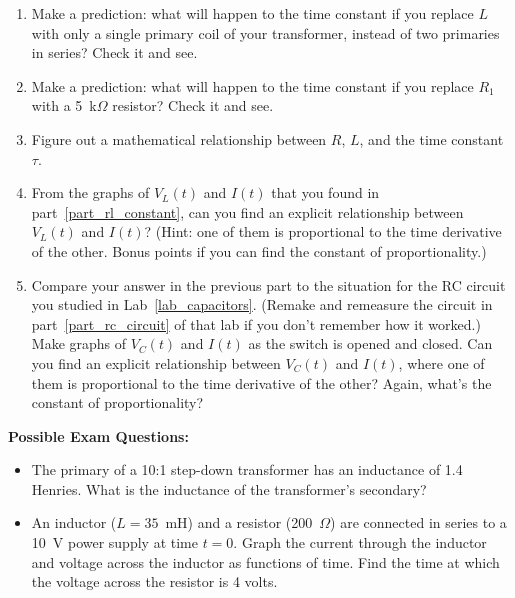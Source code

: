 \begin{enumerate}[wide]
\item Make a prediction: what will happen to the time constant if you replace $L$ with only a single primary coil of your transformer, instead of two primaries in series?  Check it and see.    

\item Make a prediction: what will happen to the time constant if you replace $R_1$ with a 5~k$\Omega$ resistor?  Check it and see.

\item Figure out a mathematical relationship between $R$, $L$, and the time constant $\tau$.

\item From the graphs of $V_{L}(t)$ and $I(t)$ that you found in part~\ref{part_rl_constant}, can you find an explicit relationship between  $V_{L}(t)$ and $I(t)$?  (Hint: one of them is proportional to the time derivative of the other.  Bonus points if you can find the constant of proportionality.)

\item Compare your answer in the previous part to the situation for the RC circuit you studied in Lab~\ref{lab_capacitors}.  (Remake and remeasure the circuit in part~\ref{part_rc_circuit} of that lab if you don't remember how it worked.)  Make graphs of $V_{C}(t)$ and $I(t)$ as the switch is opened and closed.  Can you find an explicit relationship between $V_{C}(t)$ and $I(t)$, where one of them is proportional to the time derivative of the other?  Again, what's the constant of proportionality?


\end{enumerate}

\textbf{Possible Exam Questions:}

\begin{itemize}
\item The primary of a 10:1 step-down transformer has an inductance of 1.4 Henries.  What is the inductance of the transformer's secondary?

\item An inductor ($L = 35$~mH) and a resistor (200~$\Omega$) are connected in series to a 10~V power supply at time $t = 0$.  Graph the current through the inductor and voltage across the inductor as functions of time.  Find the time at which the voltage across the resistor is 4 volts.

\end{itemize}






